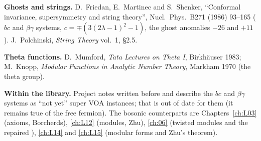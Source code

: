 \textbf{Ghosts and strings.} D.~Friedan, E.~Martinec and S.~Shenker, ``Conformal invariance,
supersymmetry and string theory'', Nucl.\ Phys.\ B271 (1986) 93--165 ($bc$ and $\beta\gamma$ systems,
$c=\mp(3(2\lambda-1)^2-1)$, the ghost anomalies $-26$ and $+11$). J.~Polchinski, \emph{String Theory}
vol.~1, §2.5.

\textbf{Theta functions.} D.~Mumford, \emph{Tata Lectures on Theta I}, Birkhäuser 1983; M.~Knopp,
\emph{Modular Functions in Analytic Number Theory}, Markham 1970 (the theta group).

\textbf{Within the library.} Project notes written before  and
 describe the $bc$ and $\beta\gamma$ systems as ``not yet'' super VOA instances; that is out of
date for them (it remains true of the free fermion). The bosonic counterparts are Chapters~\ref{ch:L03} (axioms, Borcherds), \ref{ch:L12} (modules,
Zhu), \ref{ch:06} (twisted modules and the repaired ), \ref{ch:L14} and
\ref{ch:L15} (modular forms and Zhu's theorem).

\endgroup
